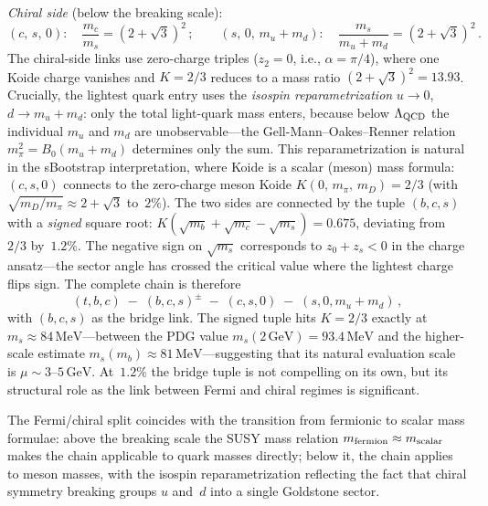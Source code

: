 \documentclass[12pt,a4paper]{article}
\makeatletter
\newcommand{\MeV}{\,\mathrm{MeV}}
\newcommand{\GeV}{\,\mathrm{GeV}}
\newcommand{\ie}{i.e.\@}
\makeatother
\begin{document}
\noindent
\emph{Chiral side} (below the breaking scale):
\begin{equation}
  (c,\,s,\,0):\quad \frac{m_c}{m_s} = (2{+}\sqrt{3})^2\,;
  \qquad
  (s,\,0,\,m_u{+}m_d):\quad \frac{m_s}{m_u{+}m_d} = (2{+}\sqrt{3})^2\,.
  \label{eq:chain_chiral}
\end{equation}
The chiral-side links use zero-charge triples ($z_2 = 0$, \ie,
$\alpha = \pi/4$), where one Koide charge vanishes and
$K = 2/3$ reduces to a mass ratio $(2{+}\sqrt{3})^2 = 13.93$.
Crucially, the lightest quark entry uses the \emph{isospin
reparametrization} $u \to 0$, $d \to m_u + m_d$: only the
total light-quark mass enters, because below $\Lambda_{\rm QCD}$
the individual $m_u$ and $m_d$ are unobservable---the
Gell-Mann--Oakes--Renner relation $m_\pi^2 = B_0(m_u{+}m_d)$
determines only the sum.
This reparametrization is natural in the sBootstrap interpretation,
where Koide is a scalar (meson) mass formula:
$(c,s,0)$ connects to the zero-charge meson Koide
$K(0,\, m_\pi,\, m_D) = 2/3$ (with $\sqrt{m_D/m_\pi} \approx
2{+}\sqrt{3}$ to~$2\%$).
The two sides are connected by the tuple $(b,c,s)$ with a
\emph{signed} square root: $K(\sqrt{m_b} + \sqrt{m_c} - \sqrt{m_s})
= 0.675$, deviating from~$2/3$ by~$1.2\%$.
The negative sign on $\sqrt{m_s}$ corresponds to
$z_0 + z_s < 0$ in the charge ansatz---the sector angle has crossed
the critical value where the lightest charge flips sign.
The complete chain is therefore
\begin{equation}
  (t,b,c) \;-\; (b,c,s)^{\pm} \;-\; (c,s,0) \;-\; (s,0,m_u{+}m_d)\,,
  \label{eq:fullchain}
\end{equation}
with $(b,c,s)$ as the bridge link. The signed tuple
hits $K = 2/3$ exactly at $m_s \approx 84\MeV$---between
the PDG value $m_s(2\GeV) = 93.4\MeV$ and the higher-scale
estimate $m_s(m_b) \approx 81\MeV$---suggesting that its
natural evaluation scale is $\mu \sim 3$--$5\GeV$.
At~$1.2\%$ the bridge tuple is not compelling on its own,
but its structural role as the link between Fermi and chiral
regimes is significant.

The Fermi/chiral split coincides with the transition from
fermionic to scalar mass formulae: above the breaking scale
the SUSY mass relation $m_{\rm fermion} \approx m_{\rm scalar}$
makes the chain applicable to quark masses directly; below it,
the chain applies to meson masses, with the isospin
reparametrization reflecting the fact that chiral symmetry
breaking groups $u$ and~$d$ into a single Goldstone sector.
\end{document}
